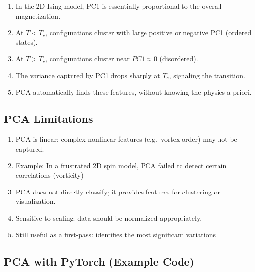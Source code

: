\documentclass[%
oneside,                 %
final,                   %
10pt]{article}
\begin{document}
\begin{enumerate}
\item In the 2D Ising model, PC1 is essentially proportional to the overall magnetization.

\item At $T<T_c$, configurations cluster with large positive or negative PC1 (ordered states).

\item At $T>T_c$, configurations cluster near $PC1 \approx 0$ (disordered).

\item The variance captured by PC1 drops sharply at $T_c$, signaling the transition.

\item PCA automatically finds these features, without knowing the physics a priori.
\end{enumerate}

\noindent
\subsection{PCA Limitations}
\begin{enumerate}
\item PCA is linear: complex nonlinear features (e.g.\ vortex order) may not be captured.

\item Example: In a frustrated 2D spin model, PCA failed to detect certain correlations (vorticity) 

\item PCA does not directly classify; it provides features for clustering or visualization.

\item Sensitive to scaling: data should be normalized appropriately.

\item Still useful as a first-pass: identifies the most significant variations 
\end{enumerate}

\noindent
\subsection{PCA with PyTorch (Example Code)}
\end{document}
